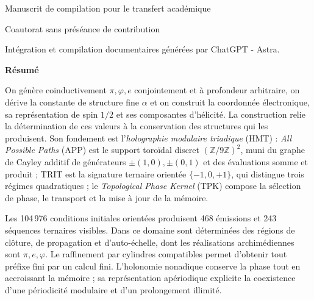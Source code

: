 \thispagestyle{plain}
\begingroup\centering
{\fontsize{9.5}{10.7}\selectfont Manuscrit de compilation pour le transfert académique\par}
\vspace{3mm}
{\fontsize{17}{20.5}\selectfont\bfseries\Titulo\par}
\vspace{6pt}
{\fontsize{11.5}{14}\selectfont\Autores\par}
\vspace{3pt}
{\fontsize{8}{10}\selectfont Coautorat sans préséance de contribution\par}
\vspace{3pt}
{\fontsize{8}{10}\selectfont Intégration et compilation documentaires générées par ChatGPT - Astra.\par}
\par\endgroup
\vspace{5pt}
{\centering\bfseries Résumé\par}
\vspace{2pt}
\begingroup
\fontsize{9.5}{10.7}\selectfont
\setlength{\parskip}{1.5pt plus .5pt minus .5pt}
\noindent
On génère coinductivement \(\pi,\varphi,e\) conjointement et à profondeur arbitraire, on
dérive la constante de structure fine \(\alpha\) et on construit la
coordonnée électronique, sa représentation de spin \(1/2\) et ses
composantes d'hélicité. La construction relie la détermination de
ces valeurs à la conservation des structures qui les produisent.
Son fondement est l'\emph{holographie modulaire triadique} (HMT) :
\emph{All Possible Paths} (APP) est le support toroïdal discret
\((\mathbb Z/9\mathbb Z)^2\), muni du graphe de Cayley additif
de générateurs \(\pm(1,0),\pm(0,1)\) et des évaluations somme et
produit ; TRIT est la signature ternaire orientée \(\{-1,0,+1\}\), qui
distingue trois régimes quadratiques ; le \emph{Topological Phase Kernel}
(TPK) compose la sélection de phase, le transport et la mise à jour de la mémoire.

Les 104\,976 conditions initiales orientées produisent 468 émissions et 243
séquences ternaires visibles. Dans ce domaine sont déterminées des régions de
clôture, de propagation et d'auto-échelle, dont les réalisations archimédiennes sont
\(\pi,e,\varphi\). Le raffinement par cylindres compatibles permet d'obtenir
tout préfixe fini par un calcul fini. L'holonomie nonadique
conserve la phase tout en accroissant la mémoire ; sa représentation apériodique
explicite la coexistence d'une périodicité modulaire et d'un prolongement illimité.

